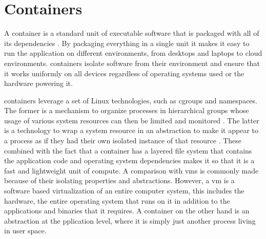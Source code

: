 \section{Containers}
\label{sec:background:containers}



A \gls{container} is a standard unit of executable software that is packaged with all of its dependencies \cite{docker-what-is-container, ibm-what-is-container}. By packaging everything in a single unit it makes it easy to run the application on different environments, from desktops and laptops to cloud environments. \Glspl{container} isolate software from their environment and ensure that it works uniformly on all devices regardless of operating systems used or the hardware powering it. 




\Glspl{container} leverage a set of Linux technologies, such as cgroups and namespaces. The former is a mechanism to organize processes in hierarchical groups whose usage of various system resources can then be limited and monitored \cite{cgroups, man-cgroups}. The latter is a technology to wrap a system resource in an abstraction to make it appear to a process as if they had their own isolated instance of that resource \cite{man-namespaces}. These combined with the fact that a container has a layered file system that contains the application code and operating system dependencies makes it so that it is a fast and lightweight unit of compute. A comparison with \glspl{vm} is commonly made because of their isolating properties and abstractions. However, a \gls{vm} is a software based virtualization of an entire computer system, this includes the hardware, the entire operating system that runs on it in addition to the applications and binaries that it requires. A \gls{container} on the other hand is an abstraction at the pplication level, where it is simply just another process living in user space.



